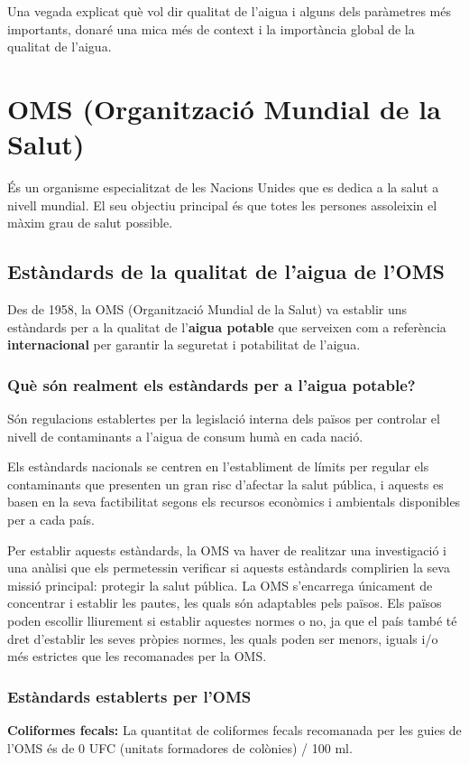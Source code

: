 Una vegada explicat què vol dir qualitat de l’aigua i alguns dels paràmetres més importants, donaré una mica més de context i la importància global de la qualitat de l’aigua.

\section{OMS (Organització Mundial de la Salut)}
És un organisme especialitzat de les Nacions Unides que es dedica a la salut a nivell mundial. El seu objectiu principal és que totes les persones assoleixin el màxim grau de salut possible.
\subsection{Estàndards de la qualitat de l’aigua de l’OMS}
Des de 1958, la OMS (Organització Mundial de la Salut) va establir uns estàndards per a la qualitat de l’\textbf{aigua potable} que serveixen com a referència \textbf{internacional} per garantir la seguretat i potabilitat de l’aigua.
\subsubsection{Què són realment els estàndards per a l’aigua potable?}
Són regulacions establertes per la legislació interna dels països per controlar el nivell de contaminants a l’aigua de consum humà en cada nació.

Els estàndards nacionals se centren en l’establiment de límits per regular els contaminants que presenten un gran risc d’afectar la salut pública, i aquests es basen en la seva factibilitat segons els recursos econòmics i ambientals disponibles per a cada país.

Per establir aquests estàndards, la OMS va haver de realitzar una investigació i una anàlisi que els permetessin verificar si aquests estàndards complirien la seva missió principal: protegir la salut pública. La OMS s’encarrega únicament de concentrar i establir les pautes, les quals són adaptables pels països. Els països poden escollir lliurement si establir aquestes normes o no, ja que el país també té dret d’establir les seves pròpies normes, les quals poden ser menors, iguals i/o més estrictes que les recomanades per la OMS.
\subsubsection{Estàndards establerts per l’OMS}
\textbf{Coliformes fecals:} La quantitat de coliformes fecals recomanada per les guies de l’OMS és de 0 UFC (unitats formadores de colònies) / 100 ml.

